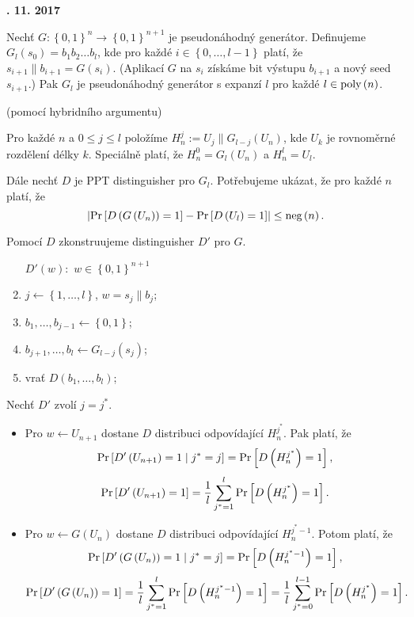 \documentclass[a4paper,12pt,titlepage]{article}
\def\podnadpis#1{{\bigskip\bf\noindent#1\medskip\par}}
\def\veta{\noindent {\bf Věta: }}
\def\dukaz{\noindent {\bf Důkaz: }}
\begin{document}
\podnadpis{9. 11. 2017}


\veta Nechť $G: \left\lbrace 0,1\right\rbrace^{n} \rightarrow \left\lbrace 0,1\right\rbrace^{n+1}$ je pseudonáhodný generátor. Definujeme $G_l\left(s_0\right) = b_1b_2\dots b_l$, kde pro každé $i \in \left\lbrace 0, \dots, l-1\right\rbrace$ platí, že $s_{i+1}\parallel b_{i+1} = G\left(s_i\right)$. (Aplikací $G$ na $s_i$ získáme bit výstupu $b_{i+1}$ a nový seed $s_{i+1}$.) Pak $G_l$ je pseudonáhodný generátor s expanzí $l$ pro každé $l \in \hbox{poly}\left(n\right)$.

\dukaz (pomocí hybridního argumentu)

Pro každé $n$ a $0 \le j \le l$ položíme $H_{n}^{j} := U_j \parallel G_{l-j}\left(U_n\right)$, kde $U_k$ je rovnoměrné rozdělení délky $k$. Speciálně platí, že $H_{n}^{0} = G_l\left(U_n\right)$ a $H_{n}^{l} = U_l$.

Dále nechť $D$ je PPT distinguisher pro $G_l$. Potřebujeme ukázat, že pro každé $n$ platí, že 
$$\left| \hbox{Pr}\left[D\left(G\left(U_n\right)\right) = 1\right] - \hbox{Pr}\left[D\left(U_l\right) = 1\right] \right| \le \hbox{neg}\left(n\right).$$

Pomocí $D$ zkonstruujeme distinguisher $D'$ pro $G$.
\begin{center}
  \parbox[c]{0.8\linewidth}{
    \begin{enumerate}
      \item [$D'\left(w\right):$]  \hspace{1cm} $w\in\left\lbrace 0, 1\right\rbrace^{n+1}$
      \item $j \leftarrow \left\lbrace 1, \dots , l\right\rbrace$, $w = s_j\parallel b_j$;
      \item $b_1, \dots, b_{j-1} \leftarrow \left\lbrace 0,1\right\rbrace$;
      \item $b_{j+1},\dots, b_l \leftarrow G_{l-j}\left(s_j\right)$;
      \item vrať $D\left(b_1,\dots,b_l\right)$;
    \end{enumerate}
  }
\end{center}

Nechť $D'$ zvolí $j = j^{\ast}$.
\begin{itemize}
  \item Pro $w \leftarrow U_{n+1}$ dostane $D$ distribuci odpovídající $H_{n}^{j^{\ast}}$. Pak platí, že
    $$\hbox{Pr}\left[D'\left(U_{n+1}\right) = 1 \mid j^\ast = j\right] = \hbox{Pr}\left[D\left(H_{n}^{j^{\ast}}\right) = 1\right],$$
    $$\hbox{Pr}\left[D'\left(U_{n+1}\right) = 1\right] = \frac{1}{l}\sum_{j^\ast = 1}^{l} \hbox{Pr}\left[D\left(H_{n}^{j^{\ast}}\right) = 1\right].$$  
  
  \item Pro $w \leftarrow G\left(U_n\right)$ dostane $D$ distribuci odpovídající $H_{n}^{j^{\ast}-1}$. Potom platí, že
    $$\hbox{Pr}\left[D'\left(G\left(U_{n}\right)\right) = 1 \mid j^\ast = j\right] = \hbox{Pr}\left[D\left(H_{n}^{j^{\ast}-1}\right) = 1\right],$$
    $$\hbox{Pr}\left[D'\left(G\left(U_{n}\right)\right) = 1\right] = \frac{1}{l}\sum_{j^{\ast} = 1}^{l} \hbox{Pr}\left[D\left(H_{n}^{j^{\ast}-1}\right) = 1\right] = \frac{1}{l}\sum_{j^\ast = 0}^{l-1} \hbox{Pr}\left[D\left(H_{n}^{j^{\ast}}\right) = 1\right].$$
\end{itemize}
\end{document}
